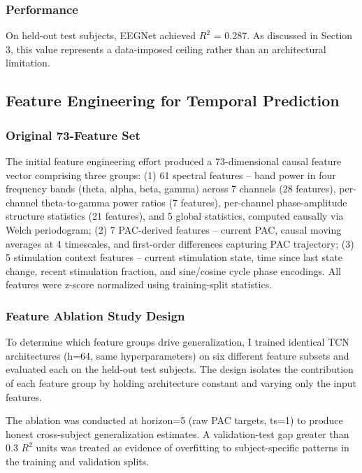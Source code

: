 \documentclass[11pt,letterpaper]{article}
\begin{document}
\subsubsection{Performance}

On held-out test subjects, EEGNet achieved $R^2$ = 0.287. As discussed in Section 3, this value represents a data-imposed ceiling rather than an architectural limitation.

\subsection{Feature Engineering for Temporal Prediction}

\subsubsection{Original 73-Feature Set}

The initial feature engineering effort produced a 73-dimensional causal feature vector comprising three groups: (1) 61 spectral features -- band power in four frequency bands (theta, alpha, beta, gamma) across 7 channels (28 features), per-channel theta-to-gamma power ratios (7 features), per-channel phase-amplitude structure statistics (21 features), and 5 global statistics, computed causally via Welch periodogram; (2) 7 PAC-derived features -- current PAC, causal moving averages at 4 timescales, and first-order differences capturing PAC trajectory; (3) 5 stimulation context features -- current stimulation state, time since last state change, recent stimulation fraction, and sine/cosine cycle phase encodings. All features were z-score normalized using training-split statistics.

\subsubsection{Feature Ablation Study Design}

To determine which feature groups drive generalization, I trained identical TCN architectures (h=64, same hyperparameters) on six different feature subsets and evaluated each on the held-out test subjects. The design isolates the contribution of each feature group by holding architecture constant and varying only the input features.

The ablation was conducted at horizon=5 (raw PAC targets, ts=1) to produce honest cross-subject generalization estimates. A validation-test gap greater than 0.3 $R^2$ units was treated as evidence of overfitting to subject-specific patterns in the training and validation splits.
\end{document}
